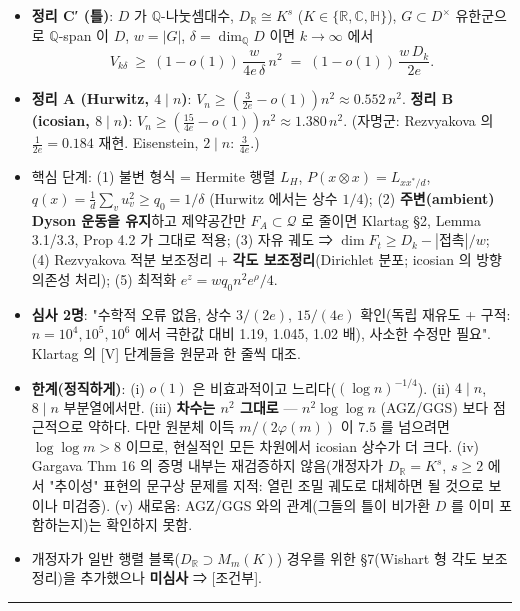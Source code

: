 \begin{itemize}
\tightlist
\item
  \textbf{정리 C′ (틀)}: \(D\) 가 \(\mathbb Q\)-나눗셈대수, \(D_\mathbb R\cong K^s\) (\(K\in\{\mathbb R,\mathbb C,\mathbb H\}\)), \(G\subset D^\times\) 유한군으로 \(\mathbb Q\)-span 이 \(D\), \(w=|G|\), \(\delta=\dim_\mathbb QD\) 이면 \(k\to\infty\) 에서
  \[V_{k\delta}\ \ge\ (1-o(1))\,\frac{w}{4e\,\delta}\,n^2\;=\;(1-o(1))\,\frac{w\,D_k}{2e}.\]
\item
  \textbf{정리 A (Hurwitz, \(4\mid n\))}: \(V_n\ge(\tfrac3{2e}-o(1))n^2\approx0.552\,n^2\). \textbf{정리 B (icosian, \(8\mid n\))}: \(V_n\ge(\tfrac{15}{4e}-o(1))n^2\approx1.380\,n^2\). (자명군: Rezvyakova 의 \(\tfrac1{2e}=0.184\) 재현. Eisenstein, \(2\mid n\): \(\tfrac3{4e}\).)
\item
  핵심 단계: (1) 불변 형식 = Hermite 행렬 \(L_H\), \(P(x\otimes x)=L_{xx^*/d}\), \(q(x)=\frac1d\sum_vu_v^2\ge q_0=1/\delta\) (Hurwitz 에서는 상수 \(1/4\)); (2) \textbf{주변(ambient) Dyson 운동을 유지}하고 제약공간만 \(F_A\subset\mathcal Q\) 로 줄이면 Klartag §2, Lemma 3.1/3.3, Prop 4.2 가 그대로 적용; (3) 자유 궤도 ⇒ \(\dim F_t\ge D_k-|\text{접촉}|/w\); (4) Rezvyakova 적분 보조정리 + \textbf{각도 보조정리}(Dirichlet 분포; icosian 의 방향 의존성 처리); (5) 최적화 \(e^z=wq_0n^2e^\rho/4\).
\item
  \textbf{심사 2명}: "수학적 오류 없음, 상수 \(3/(2e)\), \(15/(4e)\) 확인(독립 재유도 + 구적: \(n=10^4,10^5,10^6\) 에서 극한값 대비 1.19, 1.045, 1.02 배), 사소한 수정만 필요". Klartag 의 {[}V{]} 단계들을 원문과 한 줄씩 대조.
\item
  \textbf{한계(정직하게)}: (i) \(o(1)\) 은 비효과적이고 느리다(\((\log n)^{-1/4}\)). (ii) \(4\mid n\), \(8\mid n\) 부분열에서만. (iii) \textbf{차수는 \(n^2\) 그대로} --- \(n^2\log\log n\) (AGZ/GGS) 보다 점근적으로 약하다. 다만 원분체 이득 \(m/(2\varphi(m))\) 이 \(7.5\) 를 넘으려면 \(\log\log m>8\) 이므로, 현실적인 모든 차원에서 icosian 상수가 더 크다. (iv) Gargava Thm 16 의 증명 내부는 재검증하지 않음(개정자가 \(D_\mathbb R=K^s\), \(s\ge2\) 에서 "추이성" 표현의 문구상 문제를 지적: 열린 조밀 궤도로 대체하면 될 것으로 보이나 미검증). (v) 새로움: AGZ/GGS 와의 관계(그들의 틀이 비가환 \(D\) 를 이미 포함하는지)는 확인하지 못함.
\item
  개정자가 일반 행렬 블록(\(D_\mathbb R\supset M_m(K)\)) 경우를 위한 §7(Wishart 형 각도 보조정리)을 추가했으나 \textbf{미심사} ⇒ {[}조건부{]}.
\end{itemize}

\begin{center}\rule{0.5\linewidth}{0.5pt}\end{center}


